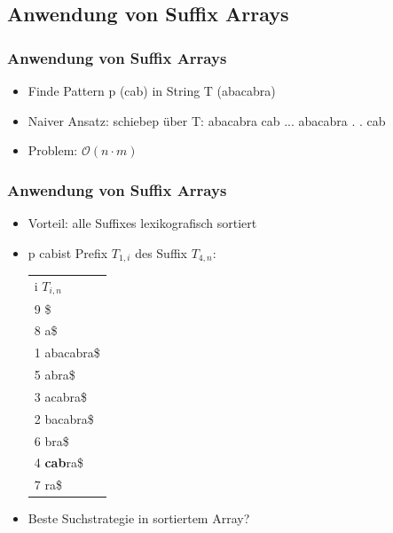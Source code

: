 \documentclass{beamer}
\begin{document}
\subsection{Anwendung von Suffix Arrays}
\begin{frame}
\frametitle{Anwendung von Suffix Arrays}
\begin{itemize}
\item Finde Pattern p (\glqq cab\grqq) in String T (\glqq abacabra\grqq)
\item Naiver Ansatz: \glqq schiebe\grqq p über T: \newline
abacabra \newline
cab\textrightarrow \newline
...\newline
abacabra \newline
. . cab
\item Problem: $\mathcal{O}(n\cdot m)$
\end{itemize}
\end{frame}
\begin{frame}
\frametitle{Anwendung von Suffix Arrays}
\begin{itemize}
\item Vorteil: alle Suffixes lexikografisch sortiert
\item p \glqq cab\grqq ist Prefix $T_{1,i}$ des Suffix $T_{4,n}$: \newline
\begin{tabular}{l}
	i $T_{i,n}$\\
9 \$\\
8 a\$\\
1 abacabra\$\\
5 abra\$\\
3 acabra\$\\
2 bacabra\$\\
6 bra\$\\
4 \color{red}\textbf{cab}\color{black}ra\$\\
7 ra\$\\
	\end{tabular}
\item Beste Suchstrategie in sortiertem Array?
\end{itemize}
\end{frame}
\end{document}
